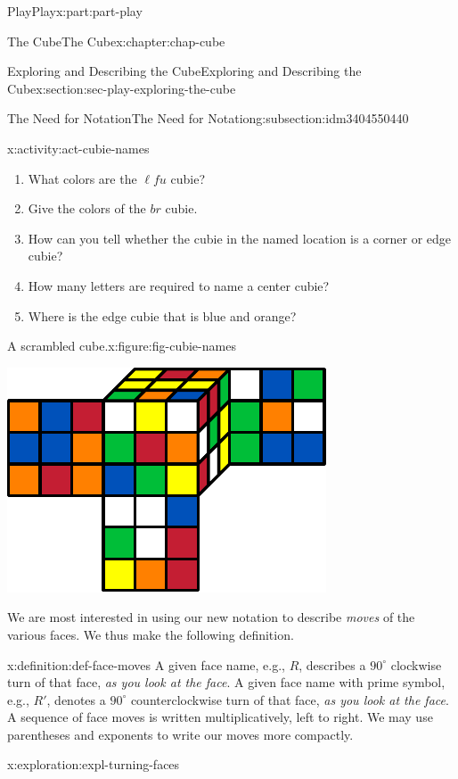 \documentclass[oneside,10pt,]{book}
\numberwithin{equation}{section}
\begin{document}
\begin{partptx}{Play}{}{Play}{}{}{x:part:part-play}
\begin{chapterptx}{The Cube}{}{The Cube}{}{}{x:chapter:chap-cube}
\begin{sectionptx}{Exploring and Describing the Cube}{}{Exploring and Describing the Cube}{}{}{x:section:sec-play-exploring-the-cube}
\begin{subsectionptx}{The Need for Notation}{}{The Need for Notation}{}{}{g:subsection:idm3404550440}
\begin{activity}{}{x:activity:act-cubie-names}
\begin{enumerate}
\item{}What colors are the \(\ell f u\) cubie?%
\item{}Give the colors of the \(br\) cubie.%
\item{}How can you tell whether the cubie in the named location is a corner or edge cubie?%
\item{}How many letters are required to name a center cubie?%
\item{}Where is the edge cubie that is blue and orange?%
\end{enumerate}
\begin{figureptx}{A scrambled cube.}{x:figure:fig-cubie-names}{}%
\begin{image}{0.25}{0.5}{0.25}%
\includegraphics[width=\linewidth]{./images/cubie_names.pdf}
\end{image}%
\tcblower
\end{figureptx}%
\end{activity}%
We are most interested in using our new notation to describe \emph{moves} of the various faces. We thus make the following definition.%
\begin{definition}{}{x:definition:def-face-moves}%
%
A given face name, e.g., \(R\), describes a \(90^\circ\) clockwise turn of that face, \emph{as you look at the face}. A given face name with prime symbol, e.g., \(R'\), denotes a \(90^\circ\) counterclockwise turn of that face, \emph{as you look at the face}. A sequence of face moves is written multiplicatively, left to right. We may use parentheses and exponents to write our moves more compactly.%
\end{definition}
\begin{exploration}{}{x:exploration:expl-turning-faces}%

\end{exploration}
\end{subsectionptx}
\end{sectionptx}
\end{chapterptx}
\end{partptx}
\end{document}
